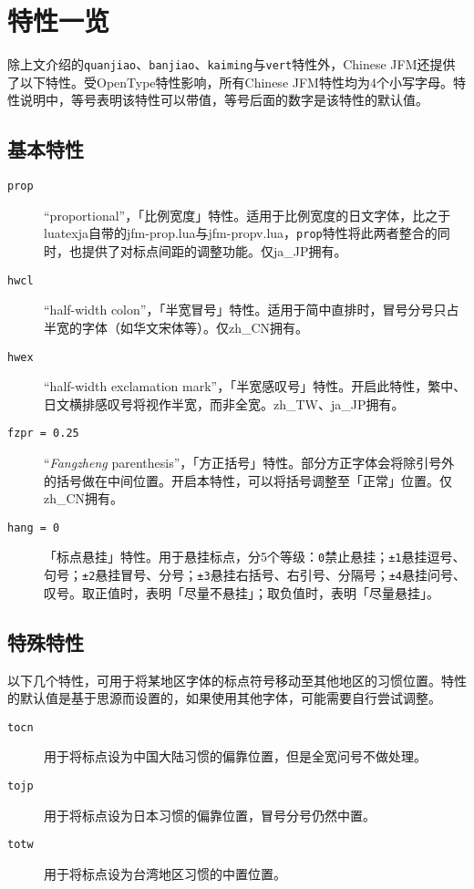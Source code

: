 \documentclass[a4paper , zihao=-4 , fontset=adobe , punct=zh_CN/kaiming]{ctexart}
\begin{document}
\section{特性一览}
除上文介绍的\+\verb|quanjiao|、\verb|banjiao|、\verb|kaiming|与\+\verb|vert|特性外，\textsf{Chinese JFM}还提供了以下特性。受OpenType特性影响，所有\textsf{Chinese JFM}特性均为4个小写字母。特性说明中，等号表明该特性可以带值，等号后面的数字是该特性的默认值。

\subsection{基本特性}
\begin{description}
    \item[\texttt{prop}] ``proportional''，「比例宽度」特性。适用于比例宽度的日文字体，比之于\textsf{lua\-texja}自带的\textsf{jfm-prop.lua}与\textsf{jfm-propv.lua}，\verb|prop|特性将此两者整合的同时，也提供了对标点间距的调整功能。仅\textsf{ja\_JP}拥有。
    \item[\texttt{hwcl}] ``half-width colon''，「半宽冒号」特性。适用于简中直排时，冒号分号只占半宽的字体（如华文宋体等）。仅\textsf{zh\_CN}拥有。
    \item[\texttt{hwex}] ``half-width exclamation mark''，「半宽感叹号」特性。开启此特性，繁中、日文横排感叹号将视作半宽，而非全宽。\textsf{zh\_TW}、\textsf{ja\_JP}拥有。
    \item[\texttt{fzpr = 0.25}] ``\textit{Fangzheng} parenthesis''，「方正括号」特性。部分方正字体会将除引号外的括号做在中间位置。开启本特性，可以将括号调整至「正常」位置。仅\textsf{zh\_CN}拥有。
    \item[\texttt{hang = 0}] 「标点悬挂」特性。用于悬挂标点，分5个等级：\verb|0|禁止悬挂；\verb|±1|悬挂逗号、句号；\verb|±2|悬挂冒号、分号；\verb|±3|悬挂右括号、右引号、分隔号；\verb|±4|悬挂问号、叹号。取正值时，表明「尽量不悬挂」；取负值时，表明「尽量悬挂」。
\end{description}

\subsection{特殊特性}
以下几个特性，可用于将某地区字体的标点符号移动至其他地区的习惯位置。特性的默认值是基于思源而设置的，如果使用其他字体，可能需要自行尝试调整。
\begin{description}
    \item[\texttt{tocn}] 用于将标点设为中国大陆习惯的偏靠位置，但是全宽问号不做处理。
    \item[\texttt{tojp}] 用于将标点设为日本习惯的偏靠位置，冒号分号仍然中置。
    \item[\texttt{totw}] 用于将标点设为台湾地区习惯的中置位置。
\end{description}
\end{document}
